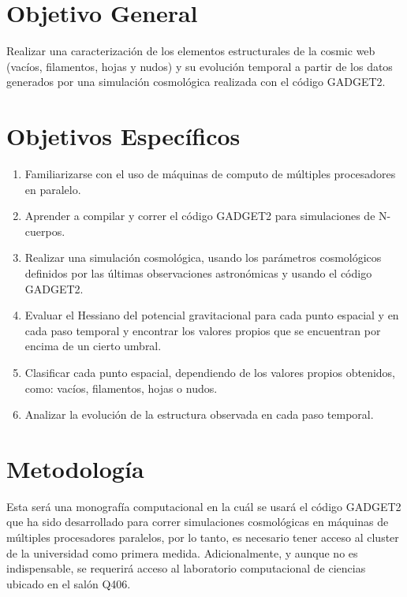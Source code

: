 \documentclass{article}
\begin{document}
\section{Objetivo General}

Realizar una caracterización de los elementos estructurales de la cosmic web (vacíos, filamentos, hojas y nudos) y su evolución temporal a partir de los datos generados por una simulación cosmológica realizada con el código GADGET2.

\section{Objetivos Específicos}

\begin{enumerate}

\item Familiarizarse con el uso de máquinas de computo de múltiples procesadores en paralelo. 
\item Aprender a compilar y correr el código GADGET2 para simulaciones de N-cuerpos.
\item Realizar una simulación cosmológica, usando los parámetros cosmológicos definidos por las últimas observaciones astronómicas y usando el código GADGET2.
\item Evaluar el Hessiano del potencial gravitacional para cada punto espacial y en cada paso temporal y encontrar los valores propios que se encuentran por encima de un cierto umbral.
\item Clasificar cada punto espacial, dependiendo de los valores propios obtenidos, como: vacíos, filamentos, hojas o nudos.
\item Analizar la evolución de la estructura observada en cada paso temporal.

\end{enumerate}


\section{Metodología}

Esta será una monografía computacional en la cuál se usará el código GADGET2 que ha sido desarrollado  para correr simulaciones cosmológicas en máquinas de múltiples procesadores paralelos, por lo tanto, es necesario tener acceso al cluster de la universidad como primera medida. Adicionalmente, y aunque no es indispensable, se requerirá acceso al laboratorio computacional de ciencias ubicado en el salón Q406.
\end{document}
